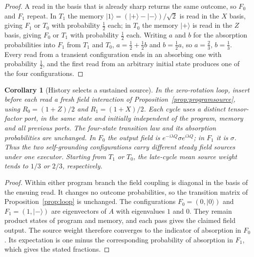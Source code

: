 \documentclass[12pt,a4paper]{article}
\newtheorem{corollary}[theorem]{Corollary}
\newcommand{\ket}[1]{|#1\rangle}
\begin{document}
\begin{proof}
A read in the basis that is already sharp returns the same outcome, so $F_0$ and $F_1$ repeat. In $T_1$ the memory $\ket1=(\ket+-\ket-)/\sqrt2$ is read in the $X$ basis, giving $F_1$ or $T_0$ with probability $\frac12$ each; in $T_0$ the memory $\ket+$ is read in the $Z$ basis, giving $F_0$ or $T_1$ with probability $\frac12$ each. Writing $a$ and $b$ for the absorption probabilities into $F_1$ from $T_1$ and $T_0$, $a=\frac12+\frac12b$ and $b=\frac12a$, so $a=\frac23$, $b=\frac13$. Every read from a transient configuration ends in an absorbing one with probability $\frac12$, and the first read from an arbitrary initial state produces one of the four configurations.
\end{proof}

\begin{corollary}[History selects a sustained source]
\label{cor:historysource}
In the zero-rotation loop, insert before each read a fresh field interaction of Proposition~\ref{prop:programsource}, using $R_0=(1+Z)/2$ and $R_1=(1+X)/2$. Each cycle uses a distinct tensor-factor port, in the same state and initially independent of the program, memory and all previous ports. The four-state transition law and its absorption probabilities are unchanged. In $F_0$ the output field is $e^{-i\lambda Q}\sigma e^{i\lambda Q}$; in $F_1$ it is $\sigma$. Thus the two self-grounding configurations carry different steady field sources under one executor. Starting from $T_1$ or $T_0$, the late-cycle mean source weight tends to $1/3$ or $2/3$, respectively.
\end{corollary}

\begin{proof}
Within either program branch the field coupling is diagonal in the basis of the ensuing read. It changes no outcome probabilities, so the transition matrix of Proposition~\ref{prop:loop} is unchanged. The configurations $F_0=(0,\ket0)$ and $F_1=(1,\ket-)$ are eigenvectors of $A$ with eigenvalues $1$ and $0$. They remain product states of program and memory, and each pass gives the claimed field output. The source weight therefore converges to the indicator of absorption in $F_0$. Its expectation is one minus the corresponding probability of absorption in $F_1$, which gives the stated fractions.
\end{proof}
\end{document}
